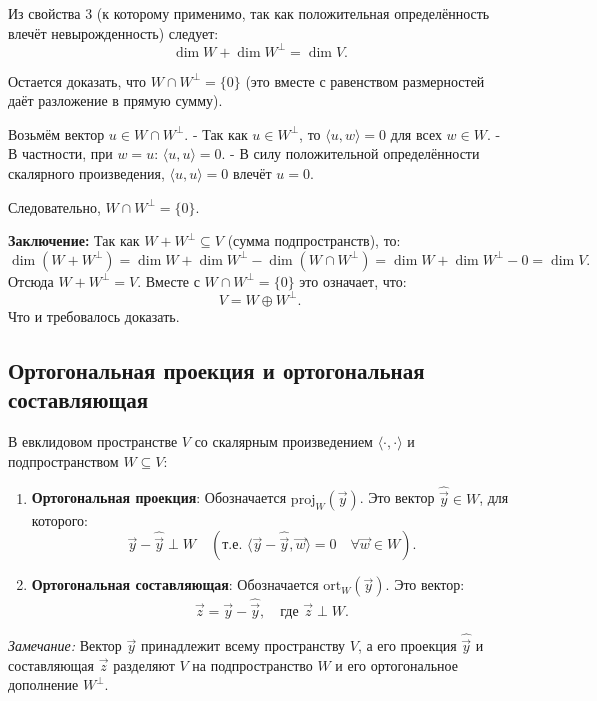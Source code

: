\documentclass[12pt]{article}
\begin{document}
Из свойства 3 (к которому применимо, так как положительная определённость влечёт невырожденность) следует:  
$$
\dim W + \dim W^\perp = \dim V.
$$  

Остается доказать, что $W \cap W^\perp = \{0\}$ (это вместе с равенством размерностей даёт разложение в прямую сумму).  

Возьмём вектор $u \in W \cap W^\perp$.  
- Так как $u \in W^\perp$, то $\langle u, w \rangle = 0$ для всех $w \in W$.  
- В частности, при $w = u$: $\langle u, u \rangle = 0$.  
- В силу положительной определённости скалярного произведения, $\langle u, u \rangle = 0$ влечёт $u = 0$.  

Следовательно, $W \cap W^\perp = \{0\}$.  

\textbf{Заключение:}  
Так как $W + W^\perp \subseteq V$ (сумма подпространств), то:  
$$
\dim(W + W^\perp) = \dim W + \dim W^\perp - \dim(W \cap W^\perp) = \dim W + \dim W^\perp - 0 = \dim V.
$$  
Отсюда $W + W^\perp = V$. Вместе с $W \cap W^\perp = \{0\}$ это означает, что:  
$$
V = W \oplus W^\perp.
$$  
Что и требовалось доказать.


\subsection*{Ортогональная проекция и ортогональная составляющая}
В евклидовом пространстве $V$ со скалярным произведением $\langle \cdot, \cdot \rangle$ и подпространством $W \subseteq V$:

\begin{enumerate}
    \item \textbf{Ортогональная проекция}:  
    Обозначается $\mathrm{proj}_W(\vec{y})$. Это вектор $\hat{\vec{y}} \in W$, для которого:
    $$
    \vec{y} - \hat{\vec{y}} \perp W \quad (\text{т.е. } \langle \vec{y} - \hat{\vec{y}}, \vec{w} \rangle = 0 \quad \forall \vec{w} \in W).
    $$
    
    \item \textbf{Ортогональная составляющая}:  
    Обозначается $\mathrm{ort}_W(\vec{y})$. Это вектор:
    $$
    \vec{z} = \vec{y} - \hat{\vec{y}}, \quad \text{где } \vec{z} \perp W.
    $$
\end{enumerate}

\textit{Замечание:} Вектор $\vec{y}$ принадлежит всему пространству $V$, а его проекция $\hat{\vec{y}}$ и составляющая $\vec{z}$ разделяют $V$ на подпространство $W$ и его ортогональное дополнение $W^\perp$.
\end{document}
